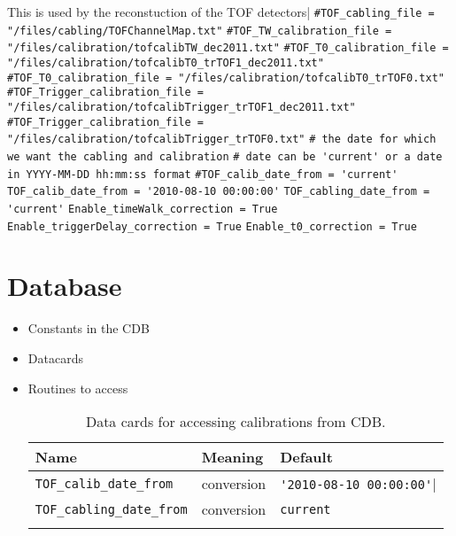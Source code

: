 This is used by the reconstuction of the TOF detectors|
\verb|#TOF_cabling_file = "/files/cabling/TOFChannelMap.txt"|
\verb|#TOF_TW_calibration_file = "/files/calibration/tofcalibTW_dec2011.txt"|
\verb|#TOF_T0_calibration_file = "/files/calibration/tofcalibT0_trTOF1_dec2011.txt"|
\verb|#TOF_T0_calibration_file = "/files/calibration/tofcalibT0_trTOF0.txt"|
\verb|#TOF_Trigger_calibration_file = "/files/calibration/tofcalibTrigger_trTOF1_dec2011.txt"|
\verb|#TOF_Trigger_calibration_file = "/files/calibration/tofcalibTrigger_trTOF0.txt"|
\verb|# the date for which we want the cabling and calibration|
\verb|# date can be 'current' or a date in YYYY-MM-DD hh:mm:ss format|
\verb|#TOF_calib_date_from = 'current'|
\verb|TOF_calib_date_from = '2010-08-10 00:00:00'|
\verb|TOF_cabling_date_from = 'current'|
\verb|Enable_timeWalk_correction = True|
\verb|Enable_triggerDelay_correction = True|
\verb|Enable_t0_correction = True|

\section{Database}
\begin{itemize}
\item Constants in the CDB
\item Datacards
\item Routines to access
\begin{table*}
\begin{center}
\caption{Data cards for accessing calibrations from CDB.}
\begin{tabularx}{\linewidth}{lXX}
\hline
Name & Meaning & Default\\
\hline
\verb|TOF_calib_date_from| & conversion & \verb|'2010-08-10 00:00:00'||\\
\verb|TOF_cabling_date_from| & conversion & \verb|current|\\
\begin{makeimage} %
\end{makeimage} 
\end{tabularx}
\end{center}
\end{table*}
\end{itemize}


